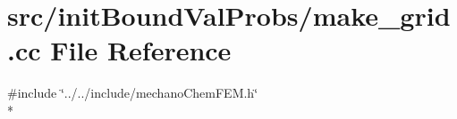 \section{src/init\-Bound\-Val\-Probs/make\-\_\-grid.cc File Reference}
\label{make__grid_8cc}
{\ttfamily \#include \char`\"{}../../include/mechano\-Chem\-F\-E\-M.\-h\char`\"{}}\\*
